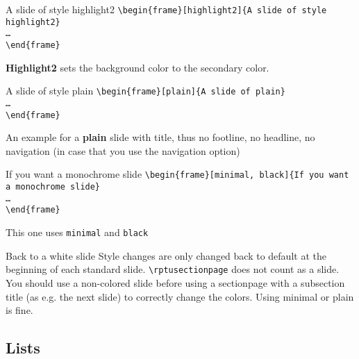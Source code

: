 \begin{frame}[highlight2]{A slide of style {\selectfont highlight2}}
	\texttt{\textbackslash begin\{frame\}[highlight2]\{A slide of style highlight2\} \\ \dots \\ \textbackslash end\{frame\}
	}
	
	\vspace{1ex}
	\textbf{Highlight2} sets the background color to the secondary color.
\end{frame}

\begin{frame}[plain]{A slide of style {\selectfont plain}}
\texttt{\textbackslash begin\{frame\}[plain]\{A slide of plain\} \\ \dots \\\textbackslash end\{frame\}
	}\vspace{1ex}
	
	An example for a \textbf{plain} slide with title, thus no footline, no headline, no navigation (in case that you use the navigation option)
\end{frame}

\begin{frame}{If you want a monochrome slide}
\texttt{\textbackslash begin\{frame\}[minimal, black]\{If you want a monochrome slide\} \\ \dots \\ \textbackslash end\{frame\}
	}\vspace{1ex}
	
	This one uses \texttt{minimal} and \texttt{black}
\end{frame}

\begin{frame}{Back to a white slide}
	Style changes are only changed back to default at the beginning of each standard slide. \texttt{\textbackslash rptusectionpage} does not count as a slide. You should use a non-colored slide before using a sectionpage with a subsection title (as e.g. the next slide) to correctly change the colors. Using minimal or plain is fine.
\end{frame}

\subsection{Lists}
\rptusectionpage

